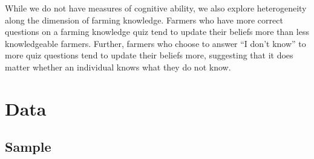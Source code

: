 \documentclass[12pt,letterpaper]{article}
\begin{document}

While we do not have measures of cognitive ability, we also explore heterogeneity along the dimension of farming knowledge. Farmers who have more correct questions on a farming knowledge quiz tend to update their beliefs more than less knowledgeable farmers. Further, farmers who choose to answer ``I don't know'' to more quiz questions tend to update their beliefs more, suggesting that it does matter whether an individual knows what they do not know.


\section{Data}\label{sec:data}

\subsection{Sample}
\end{document}
